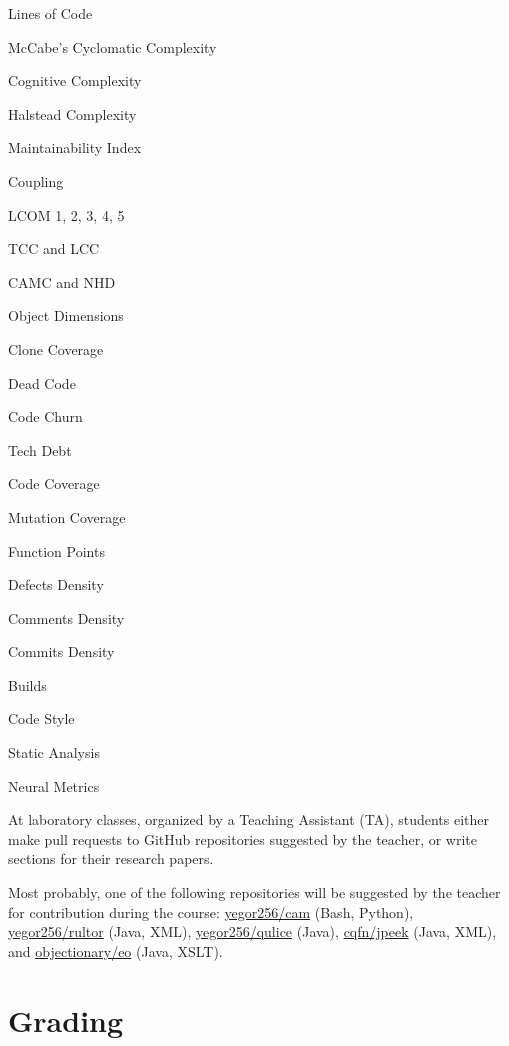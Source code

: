 \documentclass[nobrand,anonymous,nodate,nosecurity]{huawei}
\begin{document}
{
\begin{lectures}
    \item Lines of Code
    \item McCabe's Cyclomatic Complexity
    \item Cognitive Complexity
    \item Halstead Complexity
    \item Maintainability Index
    \item Coupling
    \item LCOM 1, 2, 3, 4, 5
    \item TCC and LCC
    \item CAMC and NHD
    \item Object Dimensions
    \item Clone Coverage
    \item Dead Code
    \item Code Churn
    \item Tech Debt
    \item Code Coverage
    \item Mutation Coverage
    \item Function Points
    \item Defects Density
    \item Comments Density
    \item Commits Density
    \item Builds
    \item Code Style
    \item Static Analysis
    \item Neural Metrics
\end{lectures}

At laboratory classes, organized by a Teaching Assistant (TA),
students either make pull requests to
GitHub repositories suggested by the teacher, or write sections
for their research papers.

Most probably, one of the following repositories will be suggested
by the teacher for contribution during the course:
\href{https://github.com/yegor256/cam}{yegor256/cam} (Bash, Python),
\href{https://github.com/yegor256/rultor}{yegor256/rultor} (Java, XML),
\href{https://github.com/yegor256/qulice}{yegor256/qulice} (Java),
\href{https://github.com/cqfn/jpeek}{cqfn/jpeek} (Java, XML),
and
\href{https://github.com/objectionary/eo}{objectionary/eo} (Java, XSLT).

\newpage
\section*{Grading}

}
\end{document}
